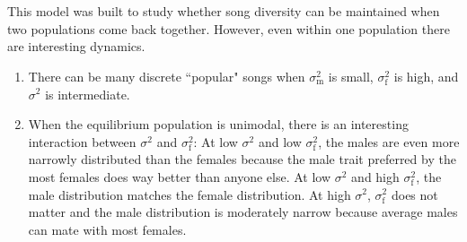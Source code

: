 \documentclass{article}
\begin{document}
\section*{} This model was built to study whether song diversity can be maintained when two populations come back together. However, even within one population there are interesting dynamics.
\begin{enumerate}
\item There can be many discrete ``popular" songs when $\sigma_\text{m}^2$  is small, $\sigma_\text{f}^2$ is high, and $\sigma^2$ is intermediate.
\item When the equilibrium population is unimodal, there is an interesting interaction between $\sigma^2$ and $\sigma_\text{f}^2$: At low $\sigma^2$ and low $\sigma_\text{f}^2$, the males are even more narrowly distributed than the females because the male trait preferred by the most females does way better than anyone else. At low $\sigma^2$ and high $\sigma_\text{f}^2$, the male distribution matches the female distribution. At high $\sigma^2$, $\sigma_\text{f}^2$ does not matter and the male distribution is moderately narrow because average males can mate with most females. 
\end{enumerate}



\end{document}
